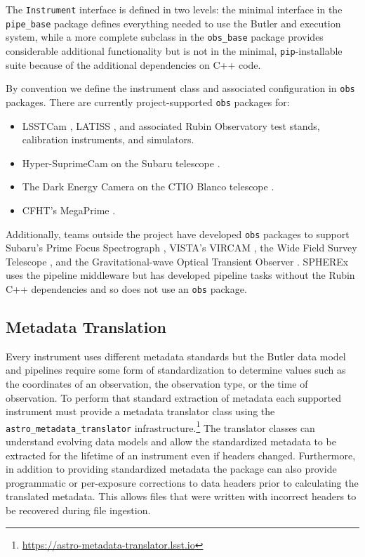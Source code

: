 The \texttt{Instrument} interface is defined in two levels: the minimal interface in the \texttt{pipe\_base} package defines everything needed to use the Butler and execution system, while a more complete subclass in the \texttt{obs\_base} package provides considerable additional functionality but is not in the minimal, \texttt{pip}-installable suite because of the additional dependencies on C++ code.

By convention we define the instrument class and associated configuration in \texttt{obs} packages.
There are currently project-supported \texttt{obs} packages for:

\begin{itemize}
\item LSSTCam \citep{10.71929/rubin/2571927,2024SPIE13096E..1SR,2010SPIE.7735E..0JK}, LATISS \citep{10.71929/rubin/2571930,2020SPIE11452E..0UI}, and associated Rubin Observatory test stands, calibration instruments, and simulators.
\item Hyper-SuprimeCam on the Subaru telescope \citep{2018PASJ...70S...1M}.
\item The Dark Energy Camera on the CTIO Blanco telescope \citep{2015AJ....150..150F,2008SPIE.7014E..0ED}.
\item CFHT's MegaPrime \citep{2003SPIE.4841...72B}.
\end{itemize}

Additionally, teams outside the project have developed \texttt{obs} packages to support Subaru's Prime Focus Spectrograph \citep{2020SPIE11447E..7VW}, VISTA's VIRCAM \citep{2015A&A...575A..25S},
the Wide Field Survey Telescope \citep[WFST;][]{2025arXiv250115018C}, and the Gravitational-wave Optical Transient Observer \citep[GOTO;][]{2021PASA...38....4M}.
SPHEREx \citep{2020SPIE11443E..0IC} uses the pipeline middleware but has developed pipeline tasks without the Rubin C++ dependencies and so does not use an \texttt{obs} package.

\subsection{Metadata Translation}

Every instrument uses different metadata standards but the Butler data model and pipelines require some form of standardization to determine values such as the coordinates of an observation, the observation type, or the time of observation.
To perform that standard extraction of metadata each supported instrument must provide a metadata translator class using the \texttt{astro\_metadata\_translator} infrastructure.\footnote{\url{https://astro-metadata-translator.lsst.io}}
The translator classes can understand evolving data models and allow the standardized metadata to be extracted for the lifetime of an instrument even if headers changed.
Furthermore, in addition to providing standardized metadata the package can also provide programmatic or per-exposure corrections to data headers prior to calculating the translated metadata.
This allows files that were written with incorrect headers to be recovered during file ingestion.
